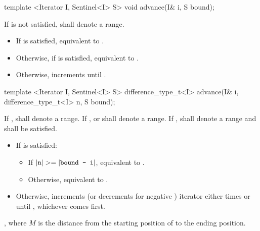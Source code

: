 \begin{addedblock}
\begin{itemdecl}
template <Iterator I, Sentinel<I> S>
  void advance(I& i, S bound);
\end{itemdecl}

\begin{itemdescr}
\pnum
\requires
If
 is not satisfied, 
shall denote a range.

\pnum
\effects
\begin{itemize}
\item If  is satisfied,
      equivalent to .

\item Otherwise, if
       is satisfied, equivalent to .

\item Otherwise, increments  until .
\end{itemize}
\end{itemdescr}

\begin{itemdecl}
template <Iterator I, Sentinel<I> S>
  difference_type_t<I> advance(I& i, difference_type_t<I> n, S bound);
\end{itemdecl}

\begin{itemdescr}
\pnum
\requires
If ,  shall denote a range. If
,  or  shall denote a range. If ,
 shall denote a range and 
shall be satisfied.

\pnum
\effects
\begin{itemize}
\item If  is satisfied:
      \begin{itemize}
      \item If \brk{}$|\texttt{n}| >= |\texttt{bound - i}|$, equivalent to .

      \item Otherwise, equivalent to .
      \end{itemize}

\item Otherwise, increments (or decrements for negative )
      iterator  either  times or until ,
      whichever comes first.
\end{itemize}

\pnum
\returns
{}, where $M$ is the distance from the starting position of
 to the ending position.
\end{itemdescr}
\end{addedblock}

